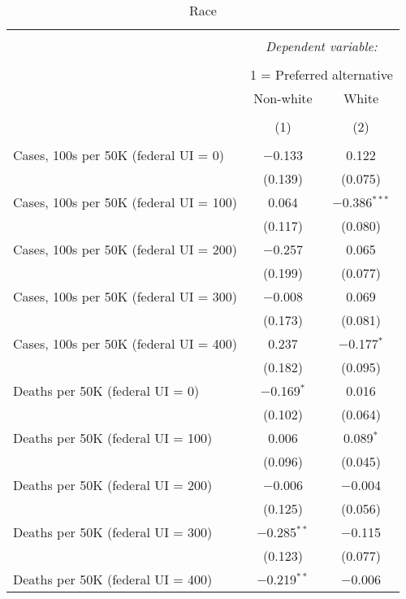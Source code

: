 
\begin{table}[!htbp] \centering \scriptsize 
  \caption{Race} 
  \label{} 
\begin{tabular}{@{\extracolsep{5pt}}lcc} 
\\[-1.8ex]\hline 
\hline \\[-1.8ex] 
 & \multicolumn{2}{c}{\textit{Dependent variable:}} \\ 
\cline{2-3} 
\\[-1.8ex] & \multicolumn{2}{c}{1 = Preferred alternative} \\ 
 & Non-white & White \\ 
\\[-1.8ex] & (1) & (2)\\ 
\hline \\[-1.8ex] 
 Cases, 100s per 50K (federal UI = 0) & $-$0.133 & 0.122 \\ 
  & (0.139) & (0.075) \\ 
  Cases, 100s per 50K (federal UI = 100) & 0.064 & $-$0.386$^{***}$ \\ 
  & (0.117) & (0.080) \\ 
  Cases, 100s per 50K (federal UI = 200) & $-$0.257 & 0.065 \\ 
  & (0.199) & (0.077) \\ 
  Cases, 100s per 50K (federal UI = 300) & $-$0.008 & 0.069 \\ 
  & (0.173) & (0.081) \\ 
  Cases, 100s per 50K (federal UI = 400) & 0.237 & $-$0.177$^{*}$ \\ 
  & (0.182) & (0.095) \\ 
  Deaths per 50K (federal UI = 0) & $-$0.169$^{*}$ & 0.016 \\ 
  & (0.102) & (0.064) \\ 
  Deaths per 50K (federal UI = 100) & 0.006 & 0.089$^{*}$ \\ 
  & (0.096) & (0.045) \\ 
  Deaths per 50K (federal UI = 200) & $-$0.006 & $-$0.004 \\ 
  & (0.125) & (0.056) \\ 
  Deaths per 50K (federal UI = 300) & $-$0.285$^{**}$ & $-$0.115 \\ 
  & (0.123) & (0.077) \\ 
  Deaths per 50K (federal UI = 400) & $-$0.219$^{**}$ & $-$0.006 \\ 

\end{tabular}
\end{table}
